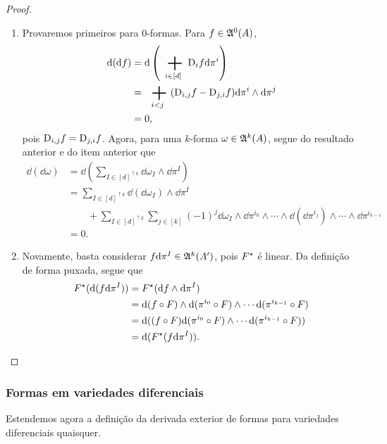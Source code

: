 \begin{proof}
\begin{enumerate}
	\item Provaremos primeiros para $0$-formas. Para $f \in \mathfrak{A}^0 (A)$,
		\begin{align*}
		\dd(\dd f) &= \dd\left( \sum_{i \in [d]} \D_i f \dd\pi^i \right) \\
			&= \sum_{i<j} (\D_{i,j} f - \D_{j,i} f) \dd\pi^i \wedge \dd\pi^j \\
			&= 0,
		\end{align*}
pois $\mathrm{D}_{i,j} f = \mathrm{D}_{j,i} f$. Agora, para uma $k$-forma $\omega \in \mathfrak{A}^k(A)$, segue do resultado anterior e do item anterior que
	\begin{align*}
	\dd(\dd \omega) &= \dd \left( \sum_{I \in [d]^{\uparrow k}} \dd \omega_I \wedge \dd\pi^I \right) \\
	&= \sum_{I \in [d]^{\uparrow k}} \dd(\dd \omega_I) \wedge \dd\pi^I \\
	&\qquad + \sum_{I \in [d]^{\uparrow k}}\sum_{j \in [k]}(-1)^j \dd \omega_I \wedge \dd\pi^{i_0} \wedge \cdots \wedge \dd(\dd\pi^{i_j}) \wedge \cdots \wedge \dd\pi^{i_{k-1}} \\
	&= 0.
	\end{align*}

	\item Novamente, basta considerar $f \mathrm{d}\pi^I \in \mathfrak{A}^k (A')$, pois $F^\star$ é linear. Da definição de forma puxada, segue que
		\begin{align*}
		F^\star (\mathrm{d}(f \mathrm{d}\pi^I)) &= F^\star (\mathrm{d} f \wedge \mathrm{d}\pi^I) \\
			&= \mathrm{d}(f \circ F) \wedge \mathrm{d}(\pi^{i_0} \circ F) \wedge \cdots \mathrm{d}(\pi^{i_{k-1}} \circ F) \\
			&= \mathrm{d}((f \circ F)\mathrm{d}(\pi^{i_0} \circ F) \wedge \cdots \mathrm{d}(\pi^{i_{k-1}} \circ F)) \\
			&= \mathrm{d}(F^\star(f \mathrm{d}\pi^I)).
		\end{align*}
	\end{enumerate}
\end{proof}


\subsubsection{Formas em variedades diferenciais}

Estendemos agora a definição da derivada exterior de formas para variedades diferenciais quaisquer.

